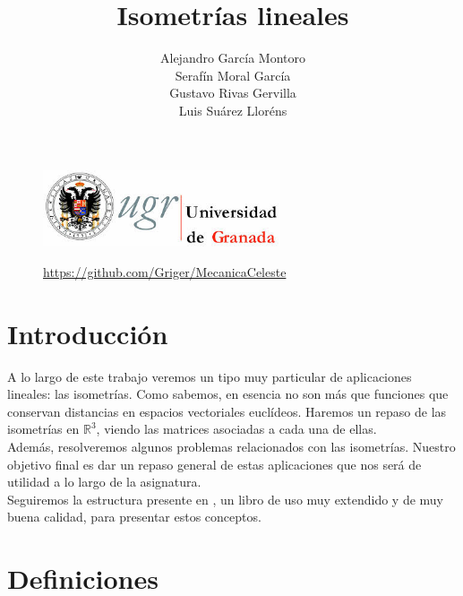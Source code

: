 \documentclass[10pt,a4paper]{article}
\author{Alejandro García Montoro \\ Serafín Moral García \\ Gustavo Rivas Gervilla \\ Luis Suárez Lloréns}
\title{Isometrías lineales}
\date{}
\theoremstyle{mystyle}
\newtheorem{defi}{\textcolor{red}{\textbf{Definición}}}
\begin{document}
\maketitle

\begin{figure}[H]
\centering
\includegraphics[width=70mm]{escudo.jpeg}
\end{figure}

\begin{figure}
\centering
\url{https://github.com/Griger/MecanicaCeleste}
\end{figure}

\newpage

\tableofcontents

\newpage

\section{Introducción}

A lo largo de este trabajo veremos un tipo muy particular de aplicaciones lineales: las isometrías. Como sabemos, en esencia no son más que funciones que conservan distancias en espacios vectoriales euclídeos. Haremos un repaso de las isometrías en $\mathbb{R}^3$, viendo las matrices asociadas a cada una de ellas.\\

Además, resolveremos algunos problemas relacionados con las isometrías. Nuestro objetivo final es dar un repaso general de estas aplicaciones que nos será de utilidad a lo largo de la asignatura.\\

Seguiremos la estructura presente en \cite{merino}, un libro de uso muy extendido y de muy buena calidad, para presentar estos conceptos.
\section{Definiciones}

\hfill \\
\end{document}

